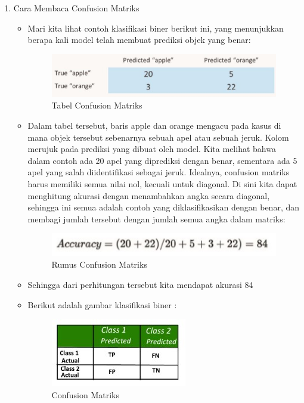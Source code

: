 \begin{enumerate}
\item Cara Membaca Confusion Matriks
	\begin{itemize}
		\item Mari kita lihat contoh klasifikasi biner berikut ini, yang menunjukkan berapa kali model telah membuat prediksi objek yang benar:
			\begin{figure}[ht]
			\centering
			\includegraphics[scale=0.5]{figures/j2a.jpg}
			\caption{Tabel Confusion Matriks}
			\label{contoh}
			\end{figure}
		\item Dalam tabel tersebut, baris apple dan orange mengacu pada kasus di mana objek tersebut sebenarnya sebuah apel atau sebuah jeruk. Kolom merujuk pada prediksi yang dibuat oleh model. Kita melihat bahwa dalam contoh ada 20 apel yang diprediksi dengan benar, sementara ada 5 apel yang salah diidentifikasi sebagai jeruk. Idealnya, confusion matriks harus memiliki semua nilai nol, kecuali untuk diagonal. Di sini kita dapat menghitung akurasi dengan menambahkan angka secara diagonal, sehingga ini semua adalah contoh yang diklasifikasikan dengan benar, dan membagi jumlah tersebut dengan jumlah semua angka dalam matriks:
			\begin{figure}[ht]
			\centering
			\includegraphics[scale=0.5]{figures/j2b.jpg}
			\caption{Rumus Confusion Matriks}
			\label{contoh}
			\end{figure}
		\item Sehingga dari perhitungan tersebut kita mendapat akurasi 84%
		\item Berikut adalah gambar klasifikasi biner :
			\begin{figure}[ht]
			\centering
			\includegraphics[scale=0.5]{figures/j2c.jpg}
			\caption{Confusion Matriks}
			\label{contoh}
			\end{figure}
	\end{itemize}
	

\end{enumerate}

